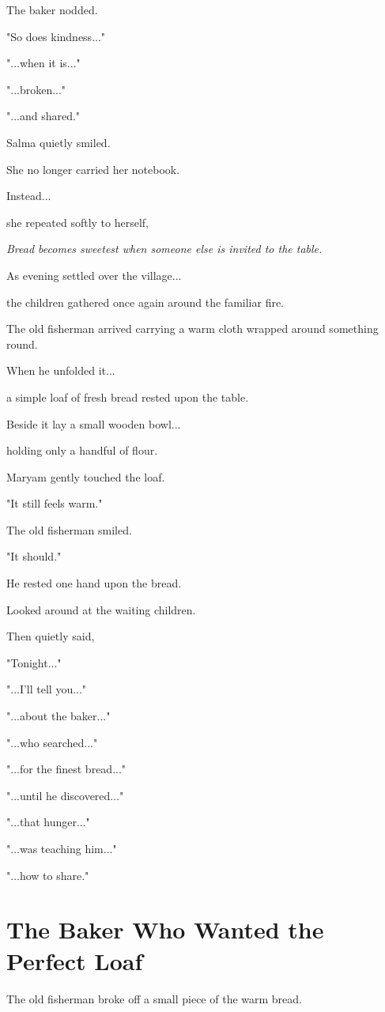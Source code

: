 \documentclass[12pt,openany]{book}
\begin{document}
The baker nodded.

"So does kindness..."

"...when it is..."

"...broken..."

"...and shared."

Salma quietly smiled.

She no longer carried her notebook.

Instead...

she repeated softly to herself,

\emph{Bread becomes sweetest when someone else is invited to the table.}

As evening settled over the village...

the children gathered once again around the familiar fire.

The old fisherman arrived carrying a warm cloth wrapped around something round.

When he unfolded it...

a simple loaf of fresh bread rested upon the table.

Beside it lay a small wooden bowl...

holding only a handful of flour.

Maryam gently touched the loaf.

"It still feels warm."

The old fisherman smiled.

"It should."

He rested one hand upon the bread.

Looked around at the waiting children.

Then quietly said,

"Tonight..."

"...I'll tell you..."

"...about the baker..."

"...who searched..."

"...for the finest bread..."

"...until he discovered..."

"...that hunger..."

"...was teaching him..."

"...how to share."
\section*{The Baker Who Wanted the Perfect Loaf}

The old fisherman broke off a small piece of the warm bread.
\end{document}
